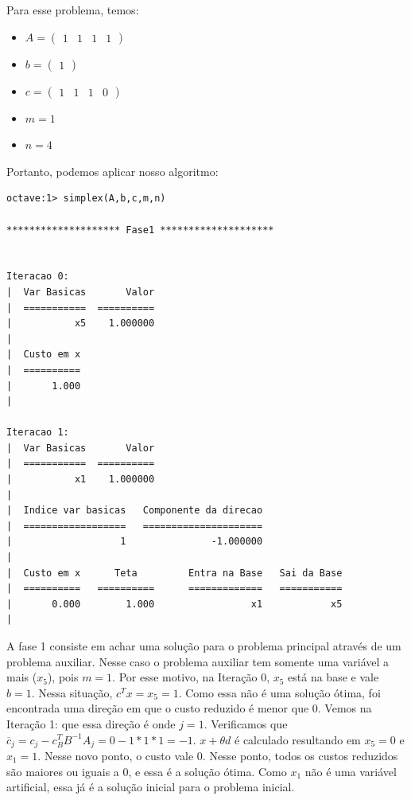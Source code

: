 \documentclass[12pt]{article}
\begin{document}
    Para esse problema, temos: 
	   
	\begin{itemize}
	\item $A = \begin{pmatrix}
    1 & 1 & 1 & 1
    \end{pmatrix}$
    
	\item $b = \begin{pmatrix}
    1 
    \end{pmatrix} $
    
    \item $c = \begin{pmatrix}
    1 & 1 & 1 & 0
    \end{pmatrix}$
    
    \item $m = 1$
    
    \item $n = 4$
	\end{itemize}
	
	Portanto, podemos aplicar nosso algoritmo:
	\begin{lstlisting}[style=term]
octave:1> simplex(A,b,c,m,n)

******************** Fase1 ********************


Iteracao 0:
|  Var Basicas       Valor
|  ===========  ==========
|           x5    1.000000
|  
|  Custo em x
|  ==========
|       1.000
|  

Iteracao 1:
|  Var Basicas       Valor
|  ===========  ==========
|           x1    1.000000
|  
|  Indice var basicas   Componente da direcao
|  ==================   =====================
|                   1               -1.000000
|  
|  Custo em x      Teta         Entra na Base   Sai da Base
|  ==========   ==========      =============   ===========
|       0.000        1.000                 x1            x5
|  
	\end{lstlisting}
	
	A fase 1 consiste em achar uma solução para o problema principal através de um problema auxiliar. Nesse caso o problema auxiliar tem somente uma variável a mais ($x_5$), pois $m = 1$. Por esse motivo, na Iteração 0, $x_5$ está na base e vale $b = 1$. Nessa situação, $c^Tx = x_5  = 1$. Como essa não é uma solução ótima, foi encontrada uma direção em que o custo reduzido é menor que 0. Vemos na Iteração 1: que essa direção é onde $j = 1$. Verificamos que $\overline{c}_j = c_j - c_B^TB^{-1}A_j = 0 - 1*1*1 = -1$. $x + \theta d$ é calculado resultando em $x_5 = 0$ e $x_1 = 1$. Nesse novo ponto, o custo vale 0. Nesse ponto, todos os custos reduzidos são maiores ou iguais a 0, e essa é a solução ótima. Como $x_1$ não é uma variável artificial, essa já é a solução inicial para o problema inicial. 
	
\end{document}
